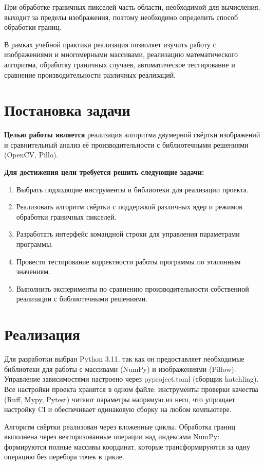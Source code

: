 \documentclass[a4paper, 12pt]{article}
\begin{document}
При обработке граничных пикселей часть области, необходимой для вычисления, выходит за пределы изображения, поэтому необходимо определить способ обработки границ.

В рамках учебной практики реализация позволяет изучить работу с изображениями и многомерными массивами, реализацию математического алгоритма, обработку граничных случаев, автоматическое тестирование и сравнение производительности различных реализаций.

\section{Постановка задачи}

\textbf{Целью работы является} реализация алгоритма двумерной свёртки изображений и сравнительный анализ её производительности с библиотечными решениями (OpenCV, Pillo).

\textbf{Для достижения цели требуется решить следующие задачи:}

\begin{enumerate}
    \item Выбрать подходящие инструменты и библиотеки для реализации проекта.
    \item Реализовать алгоритм свёртки с поддержкой различных ядер и режимов обработки граничных пикселей.
    \item Разработать интерфейс командной строки для управления параметрами программы.
    \item Провести тестирование корректности работы программы по эталонным значениям.
    \item Выполнить эксперименты по сравнению производительности собственной реализации с библиотечными решениями.
\end{enumerate}

\section{Реализация}

Для разработки выбран Python 3.11, так как он предоставляет необходимые библиотеки для работы с массивами (NumPy) и изображениями (Pillow). Управление зависимостями настроено через pyproject.toml (сборщик hatchling). Все настройки проекта хранятся в одном файле: инструменты проверки качества (Ruff, Mypy, Pytest) читают параметры напрямую из него, что упрощает настройку CI и обеспечивает одинаковую сборку на любом компьютере.

Алгоритм свёртки реализован через вложенные циклы. Обработка границ выполнена через векторизованные операции над индексами NumPy: формируются полные массивы координат, которые трансформируются за одну операцию без перебора точек в цикле.
\end{document}
